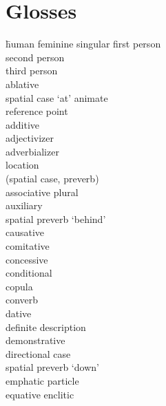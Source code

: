 
\section*{Glosses}
	\begin{multicols}{2}
    \largerpage[2]
		\begin{tabbing}
            \hspace{\tabcolsep}\= human feminine singular\kill
				\>	first person\\
				\>	second person\\
				\>	third person\\
				\>	{ablative}\\
			 \>	{spatial case} `at' animate \\
			{}		\> reference point\\
				\>	{additive}\\
				\>	{adjectivizer}\\
				\>	{adverbializer}\\
				\>	location \\
			{}		\>	({spatial case}, {preverb})\\
				\>	associative plural\\
				\>	auxiliary\\
				\>	spatial {preverb} `behind'\\
				\>	{causative}\\
				\>	{comitative}\\
				\>	{concessive}\\
				\>	{conditional}\\
				\>	{copula}\\
				\>	converb\\
				\>	{dative}\\
				\>	definite description\\
				\>	demonstrative\\
				\>	directional case\\
				\>	spatial {preverb} `down'\\
				\>	emphatic {particle}\\
				\>	equative {enclitic}\\

\end{tabbing}
\end{multicols}
